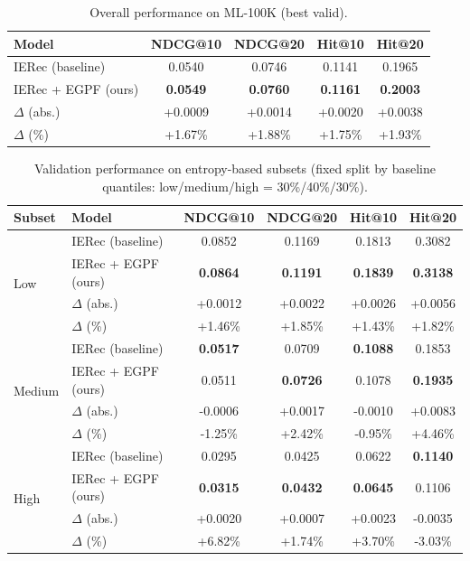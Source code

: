 \begin{table}[t]
\centering
\caption{Overall performance on ML-100K (best valid).}
\label{tab:overall_best_valid}
\setlength{\tabcolsep}{6pt}
\begin{tabular}{lcccc}
\toprule
Model & NDCG@10 & NDCG@20 & Hit@10 & Hit@20 \\
\midrule
IERec (baseline) & 0.0540 & 0.0746 & 0.1141 & 0.1965 \\
IERec + EGPF (ours) & \textbf{0.0549} & \textbf{0.0760} & \textbf{0.1161} & \textbf{0.2003} \\
\midrule
$\Delta$ (abs.) & +0.0009 & +0.0014 & +0.0020 & +0.0038 \\
$\Delta$ (\%) & +1.67\% & +1.88\% & +1.75\% & +1.93\% \\
\bottomrule
\end{tabular}
\end{table}


\begin{table}[t]
\centering
\caption{Validation performance on entropy-based subsets (fixed split by baseline quantiles: low/medium/high = 30\%/40\%/30\%).}
\label{tab:subset_valid}
\setlength{\tabcolsep}{5pt}
\begin{tabular}{llcccc}
\toprule
Subset & Model & NDCG@10 & NDCG@20 & Hit@10 & Hit@20 \\
\midrule
\multirow{4}{*}{Low} 
& IERec (baseline) & 0.0852 & 0.1169 & 0.1813 & 0.3082 \\
& IERec + EGPF (ours) & \textbf{0.0864} & \textbf{0.1191} & \textbf{0.1839} & \textbf{0.3138} \\
& $\Delta$ (abs.) & +0.0012 & +0.0022 & +0.0026 & +0.0056 \\
& $\Delta$ (\%) & +1.46\% & +1.85\% & +1.43\% & +1.82\% \\
\midrule
\multirow{4}{*}{Medium}
& IERec (baseline) & \textbf{0.0517} & 0.0709 & \textbf{0.1088} & 0.1853 \\
& IERec + EGPF (ours) & 0.0511 & \textbf{0.0726} & 0.1078 & \textbf{0.1935} \\
& $\Delta$ (abs.) & -0.0006 & +0.0017 & -0.0010 & +0.0083 \\
& $\Delta$ (\%) & -1.25\% & +2.42\% & -0.95\% & +4.46\% \\
\midrule
\multirow{4}{*}{High}
& IERec (baseline) & 0.0295 & 0.0425 & 0.0622 & \textbf{0.1140} \\
& IERec + EGPF (ours) & \textbf{0.0315} & \textbf{0.0432} & \textbf{0.0645} & 0.1106 \\
& $\Delta$ (abs.) & +0.0020 & +0.0007 & +0.0023 & -0.0035 \\
& $\Delta$ (\%) & +6.82\% & +1.74\% & +3.70\% & -3.03\% \\
\bottomrule
\end{tabular}
\end{table}


